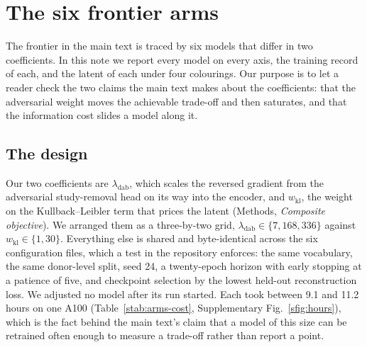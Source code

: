 %
%
%

\section{The six frontier arms}
\label{note:frontier}

The frontier in the main text is traced by six models that differ in two
coefficients. In this note we report every model on every axis, the
training record of each, and the latent of each under four colourings. Our
purpose is to let a reader check the two claims the main text makes about
the coefficients: that the adversarial weight moves the achievable
trade-off and then saturates, and that the information cost slides a model
along it.

\subsection{The design}

Our two coefficients are $\lambda_{\mathrm{dab}}$, which scales the
reversed gradient from the adversarial study-removal head on its way into
the encoder, and $w_{\mathrm{kl}}$, the weight on the Kullback--Leibler
term that prices the latent (Methods, \emph{Composite objective}). We
arranged them as a three-by-two grid,
$\lambda_{\mathrm{dab}} \in \{7, 168, 336\}$ against
$w_{\mathrm{kl}} \in \{1, 30\}$. Everything else is shared and
byte-identical across the six configuration files, which a test in the
repository enforces: the same vocabulary, the same donor-level split, seed
24, a twenty-epoch horizon with early stopping at a patience of five, and
checkpoint selection by the lowest held-out reconstruction loss. We
adjusted no model after its run started. Each took between 9.1 and 11.2
hours on one A100 (Table~\ref{stab:arms-cost},
Supplementary Fig.~\ref{sfig:hours}), which is the fact behind the main
text's claim that a model of this size can be retrained often enough to
measure a trade-off rather than report a point.

